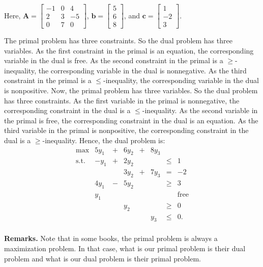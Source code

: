 \documentclass[]{book}
\newcommand{\mm}[1]{\mathbf{#1}}
\renewcommand{\vec}[1]{\mathbf{#1}}
\theoremstyle{definition}
\theoremstyle{definition}
\theoremstyle{remark}
\begin{document}
Here,
\(\mm{A}= \begin{bmatrix}  -1 & 0 & 4 \\  2 & 3 & -5 \\  0 & 7 & 0 \end{bmatrix}\),
\(\vec{b} = \begin{bmatrix}5 \\6\\8\end{bmatrix}\), and
\(\vec{c} = \begin{bmatrix}1 \\-2\\3\end{bmatrix}\).

The primal problem has three constraints. So the dual problem has three
variables. As the first constraint in the primal is an equation, the
corresponding variable in the dual is free. As the second constraint in
the primal is a \(\geq\)-inequality, the corresponding variable in the
dual is nonnegative. As the third constraint in the primal is a
\(\leq\)-inequality, the corresponding variable in the dual is
nonpositive. Now, the primal problem has three variables. So the dual
problem has three constraints. As the first variable in the primal is
nonnegative, the corresponding constraint in the dual is a
\(\leq\)-inequality. As the second variable in the primal is free, the
corresponding constraint in the dual is an equation. As the third
variable in the primal is nonpositive, the corresponding constraint in
the dual is a \(\geq\)-inequality. Hence, the dual problem is:
\[\begin{array}{rrcrcrcl}
\mbox{max} & 5y_1 & + & 6y_2 & + & 8y_3 & \\
\mbox{s.t.} & -y_1 & + & 2y_2 &   &      & \leq &  1 \\
            &      &   & 3y_2 & + & 7y_3 & = & -2 \\
            & 4y_1 & - & 5y_2 &   &      & \geq &  3 \\
            &  y_1 &   &      &   &      &      &  \mbox{free} \\ 
            &     &    & y_2  &   &      & \geq & 0 \\
            &     &    &      &   & y_3  & \leq & 0.\\
\end{array}\]

\textbf{Remarks.} Note that in some books, the primal problem is always
a maximization problem. In that case, what is our primal problem is
their dual problem and what is our dual problem is their primal problem.
\end{document}
